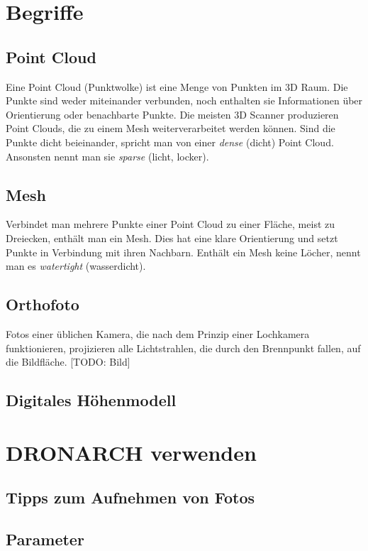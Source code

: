 \chapter{Begriffe}
		\section{Point Cloud}\label{app:point_cloud}
			Eine Point Cloud (Punktwolke) ist eine Menge von Punkten im 3D Raum. Die Punkte sind weder miteinander verbunden, noch enthalten sie Informationen über Orientierung oder benachbarte Punkte. Die meisten 3D Scanner produzieren Point Clouds, die zu einem Mesh weiterverarbeitet werden können.
			Sind die Punkte dicht beieinander, spricht man von einer \emph{dense} (dicht) Point Cloud. Ansonsten nennt man sie \emph{sparse} (licht, locker).
		
		\section{Mesh}\label{app:mesh}
			Verbindet man mehrere Punkte einer Point Cloud zu einer Fläche, meist zu Dreiecken, enthält man ein Mesh. Dies hat eine klare Orientierung und setzt Punkte in Verbindung mit ihren Nachbarn. Enthält ein Mesh keine Löcher, nennt man es \emph{watertight} (wasserdicht).
		
		\section{Orthofoto} \label{app:orthofoto}
			Fotos einer üblichen Kamera, die nach dem Prinzip einer Lochkamera funktionieren, projizieren alle Lichtstrahlen, die durch den Brennpunkt fallen, auf die Bildfläche. [TODO: Bild]
		\section{Digitales Höhenmodell} \label{app:dtm}

\chapter{DRONARCH verwenden}
	\section{Tipps zum Aufnehmen von Fotos}\label{app:tip_foto}
	\section{Parameter}\label{app:param}
	
